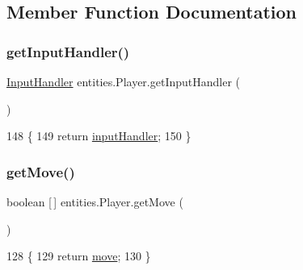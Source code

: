 \subsection{Member Function Documentation}
\mbox{\label{classentities_1_1_player_afddc465ed5f94a8137b90790e815ecea}} 
\subsubsection{\texorpdfstring{get\+Input\+Handler()}{getInputHandler()}}
{\footnotesize\ttfamily \mbox{\hyperlink{classentities_1_1_input_handler}{Input\+Handler}} entities.\+Player.\+get\+Input\+Handler (\begin{DoxyParamCaption}{ }\end{DoxyParamCaption})\hspace{0.3cm}{\ttfamily [inline]}}


\begin{DoxyCode}
148                                           \{
149         \textcolor{keywordflow}{return} \mbox{\hyperlink{classentities_1_1_player_a56ed11dfad1144c333bb21762ff6122e}{inputHandler}};
150     \}
\end{DoxyCode}
\mbox{\label{classentities_1_1_player_ae56a2b518ab7feca8267a1f07c0d7f62}} 
\subsubsection{\texorpdfstring{get\+Move()}{getMove()}}
{\footnotesize\ttfamily boolean \mbox{[}$\,$\mbox{]} entities.\+Player.\+get\+Move (\begin{DoxyParamCaption}{ }\end{DoxyParamCaption})\hspace{0.3cm}{\ttfamily [inline]}}


\begin{DoxyCode}
128                                \{
129         \textcolor{keywordflow}{return} \mbox{\hyperlink{classentities_1_1_player_afbadbf8ec5ab49e6cbadb0d39f9ad6d1}{move}};
130     \}
\end{DoxyCode}
\mbox{\label{classentities_1_1_player_a3ec19c021327522cc987ae6c4610338e}} 
